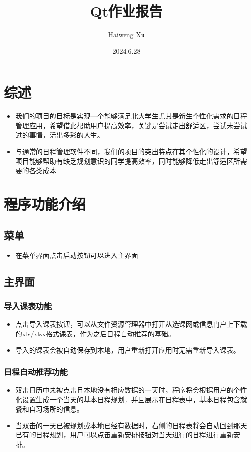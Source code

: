 \documentclass[11pt,hyperref,a4paper,UTF8]{ctexart}
\title{Qt作业报告}
\author{Haiweng Xu}
\date{2024.6.28}
\begin{document}
\begin{CJK}{UTF8}{gkai}

\maketitle
\tableofcontents

\section{综述}
\begin{itemize}
    \item 我们的项目的目标是实现一个能够满足北大学生尤其是新生个性化需求的日程管理应用，希望借此帮助用户提高效率，关键是尝试走出舒适区，尝试未尝试过的事情，活出多彩的人生。
    \item 与通常的日程管理软件不同，我们的项目的突出特点在其个性化的设计，希望项目能够帮助有缺乏规划意识的同学提高效率，同时能够降低走出舒适区所需要的各类成本
\end{itemize}

\section{程序功能介绍}

\subsection{菜单}
\begin{itemize}
    \item 在菜单界面点击启动按钮可以进入主界面
\end{itemize}

\subsection{主界面}

\subsubsection{导入课表功能}
\begin{itemize}
    \item 点击导入课表按钮，可以从文件资源管理器中打开从选课网或信息门户上下载的xls/xlsx格式课表，作为之后日程自动推荐的基础。
    \item 导入的课表会被自动保存到本地，用户重新打开应用时无需重新导入课表。
\end{itemize}


\subsubsection{日程自动推荐功能}
\begin{itemize}
    \item 双击日历中未被点击且本地没有相应数据的一天时，程序将会根据用户的个性化设置生成一个当天的基本日程规划，并且展示在日程表中，基本日程包含就餐和自习场所的信息。
    \item 当双击的一天已被规划或本地已经有数据时，右侧的日程表将会自动回到那天已有的日程规划，用户可以点击重新安排按钮对当天进行的日程进行重新安排。
\end{itemize}


\end{CJK}
\end{document}
